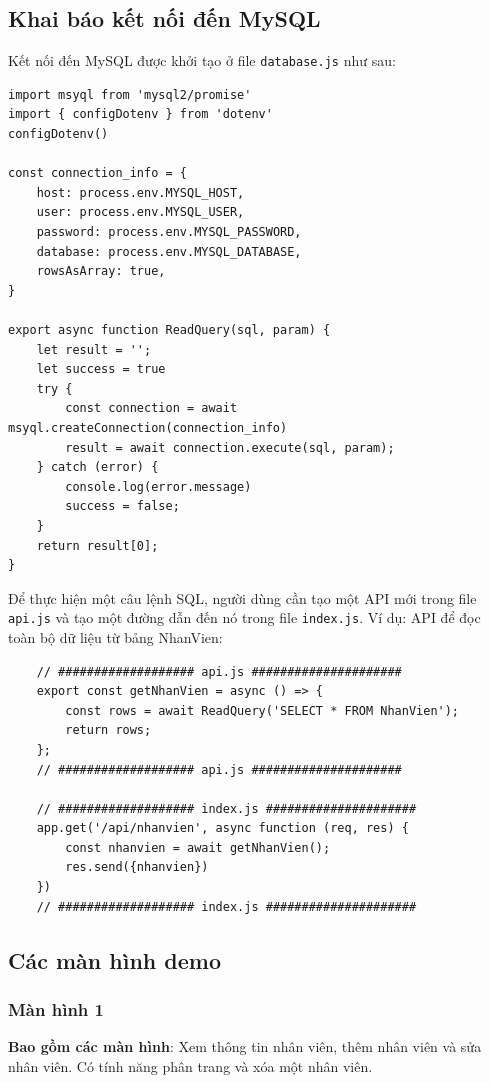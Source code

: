 \subsection{Khai báo kết nối đến MySQL}
Kết nối đến MySQL được khởi tạo ở file \texttt{database.js} như sau:
\begin{verbatim}
import msyql from 'mysql2/promise'
import { configDotenv } from 'dotenv'
configDotenv()

const connection_info = {
    host: process.env.MYSQL_HOST,
    user: process.env.MYSQL_USER,
    password: process.env.MYSQL_PASSWORD,
    database: process.env.MYSQL_DATABASE,
    rowsAsArray: true,
}

export async function ReadQuery(sql, param) {
    let result = '';
    let success = true
    try {
        const connection = await msyql.createConnection(connection_info)
        result = await connection.execute(sql, param);
    } catch (error) {
        console.log(error.message)
        success = false;
    }
    return result[0];
}
\end{verbatim}

Để thực hiện một câu lệnh SQL, người dùng cần tạo một API mới trong file \texttt{api.js} và tạo một đường dẫn đến nó trong file \texttt{index.js}. Ví dụ: API để đọc toàn bộ dữ liệu từ bảng NhanVien:
\begin{verbatim}
    // ################### api.js #####################
    export const getNhanVien = async () => {
        const rows = await ReadQuery('SELECT * FROM NhanVien');
        return rows;
    };
    // ################### api.js #####################

    // ################### index.js #####################
    app.get('/api/nhanvien', async function (req, res) {
        const nhanvien = await getNhanVien();
        res.send({nhanvien})
    })
    // ################### index.js #####################
\end{verbatim}

\newpage
\subsection{Các màn hình demo}
\subsubsection{Màn hình 1}
\textbf{Bao gồm các màn hình}: Xem thông tin nhân viên, thêm nhân viên và sửa nhân viên. Có tính năng phân trang và xóa một nhân viên.

